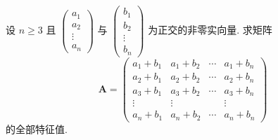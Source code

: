 \documentclass[../../main.tex]{subfiles}
\begin{document}
\begin{example}
设 $n \geqslant 3$ 且 $\begin{pmatrix} a_1 \\ a_2 \\ \vdots \\ a_n \end{pmatrix}$ 与 $\begin{pmatrix} b_1 \\ b_2 \\ \vdots \\ b_n \end{pmatrix}$ 为正交的非零实向量. 求矩阵
$$
\boldsymbol{A} = \begin{pmatrix} a_1 + b_1 & a_1 + b_2 & \cdots & a_1 + b_n \\ a_2 + b_1 & a_2 + b_2 & \cdots & a_2 + b_n \\ a_3 + b_1 & a_3 + b_2 & \cdots & a_3 + b_n \\ \vdots & \vdots & & \vdots \\ a_n + b_1 & a_n + b_2 & \cdots & a_n + b_n \end{pmatrix}
$$
的全部特征值.
\end{example}
\end{document}
